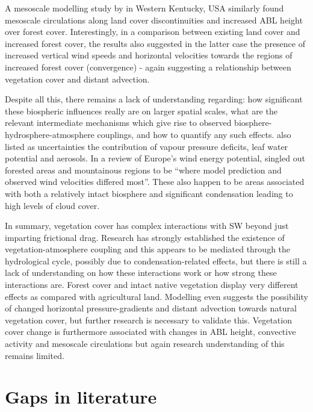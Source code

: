 A mesoscale modelling study by \citet{mahmood2011} in Western Kentucky, USA similarly found mesoscale circulations along land cover discontinuities and increased \ac{ABL} height over forest cover. Interestingly, in a comparison between existing land cover and increased forest cover, the results also suggested in the latter case the presence of increased vertical wind speeds and horizontal velocities towards the regions of increased forest cover (convergence) - again suggesting a relationship between vegetation cover and distant advection.

Despite all this, there remains a lack of understanding regarding: how significant these biospheric influences really are on larger spatial scales, what are the relevant intermediate mechanisms which give rise to observed biosphere-hydrosphere-atmosphere couplings, and how to quantify any such effects. \citet{li2020} also listed as uncertainties the contribution of vapour pressure deficits, leaf water potential and aerosols. In a review of Europe’s wind energy potential, \citet{eea2009} singled out forested areas and mountainous regions to be “where model prediction and observed wind velocities differed most”. These also happen to be areas associated with both a relatively intact biosphere and significant condensation leading to high levels of cloud cover.

In summary, vegetation cover has complex interactions with \ac{SW} beyond just imparting frictional drag. Research has strongly established the existence of vegetation-atmosphere coupling and this appears to be mediated through the hydrological cycle, possibly due to condensation-related effects, but there is still a lack of understanding on how these interactions work or how strong these interactions are. Forest cover and intact native vegetation display very different effects as compared with agricultural land. Modelling even suggests the possibility of changed horizontal pressure-gradients and distant advection towards natural vegetation cover, but further research is necessary to validate this. Vegetation cover change is furthermore associated with changes in \ac{ABL} height, convective activity and mesoscale circulations but again research understanding of this remains limited.

\section{Gaps in literature}

